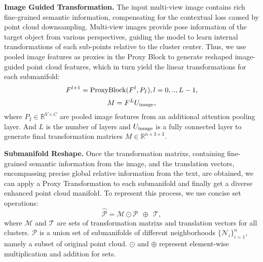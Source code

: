 \noindent \textbf{Image Guided Transformation.}
The input multi-view image contains rich fine-grained semantic information, compensating for the contextual loss caused by point cloud downsampling. Multi-view images provide pose information of the target object from various perspectives, guiding the model to learn internal transformations of each sub-points relative to the cluster center. Thus, we use pooled image features as proxies in the Proxy Block to generate reshaped image-guided point cloud features, which in turn yield the linear transformations for each submanifold:
\begin{equation}
    F^{l+1} = {\rm ProxyBlock}(F^l, P_{I}),l=0,..,L-1, 
\end{equation}
\begin{equation}
    M = F^{L}U_{\rm image},
\end{equation}
where $P_I \in \mathbb{R}^{V \times C}$ are pooled image features from an additional attention pooling layer. And $L$ is the number of layers and $U_{\rm image}$ is a fully connected layer to generate final transformation matrices $M \in \mathbb{R}^{n \times 3 \times 3}$.

\noindent \textbf{Submanifold Reshape.}
Once the transformation matrixs, containing fine-grained semantic information from the image, and the translation vectors, encompassing precise global relative information from the text, are obtained, we can apply a Proxy Transformation to each submanifold and finally get a diverse enhanced point cloud manifold. To represent this process, we use  concise set operations:
\begin{equation}\label{eq:set trans}
    \hat{\mathcal{P}} = \mathcal{M} \odot \mathcal{P}\ \  \oplus \ \ \mathcal{T}, 
\end{equation}
where $\mathcal{M}$ and $\mathcal{T}$ are sets of transformation matrixs and translation vectors for all clusters. $\mathcal{P}$ is a union set of submanifolds of different neighborhoods $\{{\mathcal{N}_i}\}_{i=1}^n$, namely a subset of original point cloud. $\odot$ and $\oplus$ represent element-wise multiplication and addition for sets.


